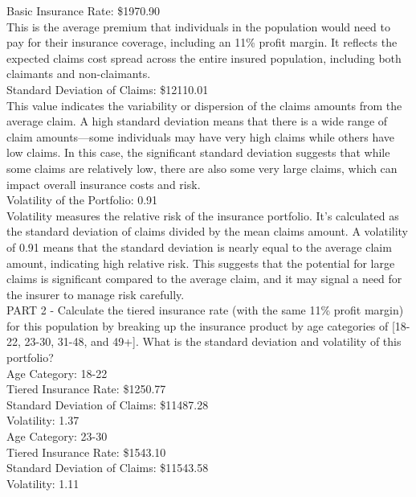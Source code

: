\documentclass[12pt]{exam}
\begin{document}
\begin{questions}
Basic Insurance Rate: \$1970.90 \\

This is the average premium that individuals in the population would need to pay for their insurance coverage, including an 11\% profit margin. It reflects the expected claims cost spread across the entire insured population, including both claimants and non-claimants. \\

Standard Deviation of Claims: \$12110.01\\

This value indicates the variability or dispersion of the claims amounts from the average claim. A high standard deviation means that there is a wide range of claim amounts—some individuals may have very high claims while others have low claims. In this case, the significant standard deviation suggests that while some claims are relatively low, there are also some very large claims, which can impact overall insurance costs and risk.\\

Volatility of the Portfolio: 0.91\\

Volatility measures the relative risk of the insurance portfolio. It's calculated as the standard deviation of claims divided by the mean claims amount. A volatility of 0.91 means that the standard deviation is nearly equal to the average claim amount, indicating high relative risk. This suggests that the potential for large claims is significant compared to the average claim, and it may signal a need for the insurer to manage risk carefully.\\

PART 2 - Calculate the tiered insurance rate (with the same 11\% profit margin) for this population by breaking up the insurance product by age categories of [18-22, 23-30, 31-48, and 49+]. What is the standard deviation and volatility of this portfolio?\\

Age Category: 18-22\\
Tiered Insurance Rate: \$1250.77\\
Standard Deviation of Claims: \$11487.28\\
Volatility: 1.37\\

Age Category: 23-30\\
Tiered Insurance Rate: \$1543.10\\
Standard Deviation of Claims: \$11543.58\\
Volatility: 1.11\\


\end{questions}
\end{document}
